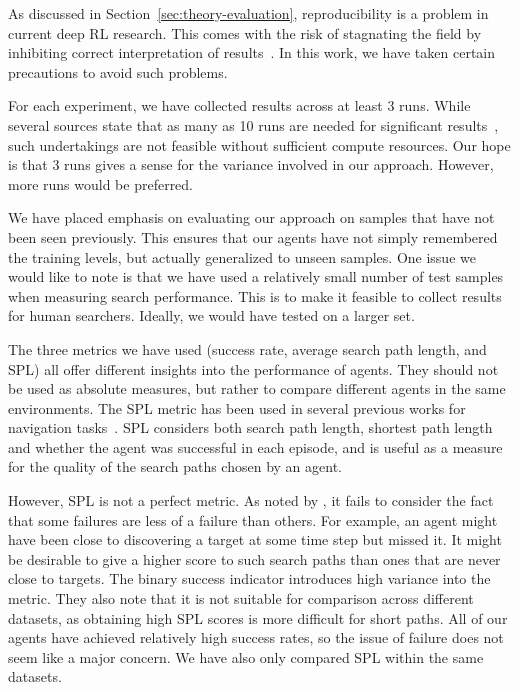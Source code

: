 As discussed in Section~\ref{sec:theory-evaluation}, reproducibility is a problem in current deep RL research.
This comes with the risk of stagnating the field by inhibiting correct interpretation of results~\cite{henderson_deep_2018}.
In this work, we have taken certain precautions to avoid such problems.

For each experiment, we have collected results across at least 3 runs.
While several sources state that as many as 10 runs are needed for significant results~\cite{colas_hitchhikers_2019,agarwal_deep_2022},
such undertakings are not feasible without sufficient compute resources.
Our hope is that 3 runs gives a sense for the variance involved in our approach.
However, more runs would be preferred.

We have placed emphasis on evaluating our approach on samples that have not been seen previously.
This ensures that our agents have not simply remembered the training levels, but actually generalized to unseen samples.
One issue we would like to note is that we have used a relatively small number of test samples when measuring search performance.
This is to make it feasible to collect results for human searchers.
Ideally, we would have tested on a larger set.

The three metrics we have used (success rate, average search path length, and SPL) all offer different insights into the performance of agents.
They should not be used as absolute measures, but rather to compare different agents in the same environments.
The SPL metric has been used in several previous works for navigation tasks~\cite{anderson_evaluation_2018,yang_visual_2018}.
SPL considers both search path length, shortest path length and whether the agent was successful in each episode,
and is useful as a measure for the quality of the search paths chosen by an agent.

However, SPL is not a perfect metric. As noted by \cite{batra_objectnav_2020}, it fails to consider the fact that some failures are less of a failure than others.
For example, an agent might have been close to discovering a target at some time step but missed it.
It might be desirable to give a higher score to such search paths than ones that are never close to targets.
The binary success indicator introduces high variance into the metric.
They also note that it is not suitable for comparison across different datasets, as obtaining high SPL scores is more difficult for short paths.
All of our agents have achieved relatively high success rates, so the issue of failure does not seem like a major concern.
We have also only compared SPL within the same datasets.

